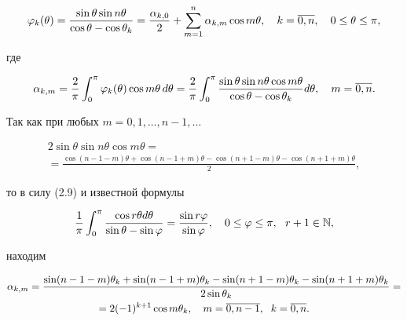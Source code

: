 \begin{pf}
\begin{equation}
\vp_k(\theta)=\frac{\sin\theta \sin n\theta}{\cos \theta - \cos


\theta_k}=


\frac{\al_{k,0}}{2}+\sum_{m=1}^n\alpha_{k,m} \cos m \theta,


\quad k=\ol{0,n},\quad 0\le\theta\le \pi,


\end{equation}


где


\begin{equation}


\al_{k,m}=\frac{2}{\pi}\int_0^\pi \vp_k(\theta)\cos m\theta\, d\theta=


\frac{2}\pi\int_0^\pi \frac{\sin \theta \sin n \theta \cos m \theta}


{\cos \theta - \cos\theta_k}d\theta, \quad m=\ol{0,n}.


\end{equation}


Так как при любых $m=0,1,\dotsc,n-1,\dotsc$


\begin{multline*}


2\sin \theta \sin n \theta \cos m\theta= \\


=\frac{\cos(n-1-m)\theta+\cos(n-1+m)\theta-\cos(n+1-m)\theta-\cos(n+1+m)\theta}{2},


\end{multline*}


то в силу (2.9) и известной формулы


\begin{equation}


\frac{1}{\pi}\int_0^\pi\frac{\cos r\theta d\theta}{\sin\theta-\sin\vp}=


\frac{\sin r\vp}{\sin \vp},\quad 0\le\vp\le\pi,\ \ r+1\in \N,


\end{equation}


находим


\begin{subequations}


\begin{multline}


\alpha_{k,m}=\frac{\sin(n-1-m)\theta_k+\sin(n-1+m)\theta_k-\sin(n+1-m)\theta_k-


\sin(n+1+m)\theta_k}{2\sin \theta_k}= \\


=2(-1)^{k+1}\cos m \theta_k, \quad m=\ol{0,n-1},\ \; k=\ol{0,n}.



\end{multline}
\end{subequations}
\end{pf}
